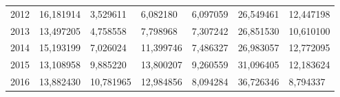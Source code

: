 \begin{table}
\begin{tabular}{p{1cm}p{2cm}p{2cm}p{2cm}p{2cm}p{2cm}p{2cm}}
 2012 &       16,181914 &                  3,529611 &     6,082180 &          6,097059 &                  26,549461 &                      12,447198 \\
 2013 &       13,497205 &                  4,758558 &     7,798968 &          7,307242 &                  26,851530 &                      10,610100 \\
 2014 &       15,193199 &                  7,026024 &    11,399746 &          7,486327 &                  26,983057 &                      12,772095 \\
 2015 &       13,108958 &                  9,885220 &    13,800207 &          9,260559 &                  31,096405 &                      12,183624 \\
 2016 &       13,882430 &                 10,781965 &    12,984856 &          8,094284 &                  36,726346 &                       8,794337 \\
\bottomrule
\end{tabular}
\end{table}
